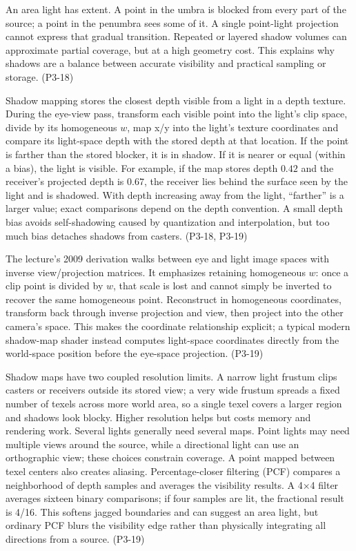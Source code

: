 An area light has extent. A point in the umbra is blocked from every part of the source; a point in the penumbra sees some of it. A single point-light projection cannot express that gradual transition. Repeated or layered shadow volumes can approximate partial coverage, but at a high geometry cost. This explains why shadows are a balance between accurate visibility and practical sampling or storage. (P3-18)

Shadow mapping stores the closest depth visible from a light in a depth texture. During the eye-view pass, transform each visible point into the light's clip space, divide by its homogeneous \(w\), map x/y into the light's texture coordinates and compare its light-space depth with the stored depth at that location. If the point is farther than the stored blocker, it is in shadow. If it is nearer or equal (within a bias), the light is visible. For example, if the map stores depth \(0.42\) and the receiver's projected depth is \(0.67\), the receiver lies behind the surface seen by the light and is shadowed. With depth increasing away from the light, ``farther'' is a larger value; exact comparisons depend on the depth convention. A small depth bias avoids self-shadowing caused by quantization and interpolation, but too much bias detaches shadows from casters. (P3-18, P3-19)

The lecture's 2009 derivation walks between eye and light image spaces with inverse view/projection matrices. It emphasizes retaining homogeneous \(w\): once a clip point is divided by \(w\), that scale is lost and cannot simply be inverted to recover the same homogeneous point. Reconstruct in homogeneous coordinates, transform back through inverse projection and view, then project into the other camera's space. This makes the coordinate relationship explicit; a typical modern shadow-map shader instead computes light-space coordinates directly from the world-space position before the eye-space projection. (P3-19)

Shadow maps have two coupled resolution limits. A narrow light frustum clips casters or receivers outside its stored view; a very wide frustum spreads a fixed number of texels across more world area, so a single texel covers a larger region and shadows look blocky. Higher resolution helps but costs memory and rendering work. Several lights generally need several maps. Point lights may need multiple views around the source, while a directional light can use an orthographic view; these choices constrain coverage. A point mapped between texel centers also creates aliasing. Percentage-closer filtering (PCF) compares a neighborhood of depth samples and averages the visibility results. A 4×4 filter averages sixteen binary comparisons; if four samples are lit, the fractional result is 4/16. This softens jagged boundaries and can suggest an area light, but ordinary PCF blurs the visibility edge rather than physically integrating all directions from a source. (P3-19)


